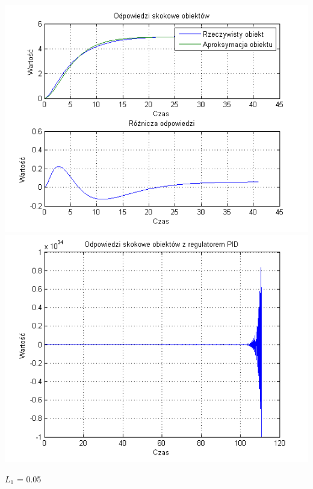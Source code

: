 \documentclass[10pt,a4paper]{article}
\begin{document}
\begin{center}
\includegraphics[scale=1]{images/dwa/skrypt_191.png}\\
\includegraphics[scale=1]{images/dwa/skrypt_192.png}\\
\end{center}
\newpage
$L_1$ = 0.05
\end{document}
